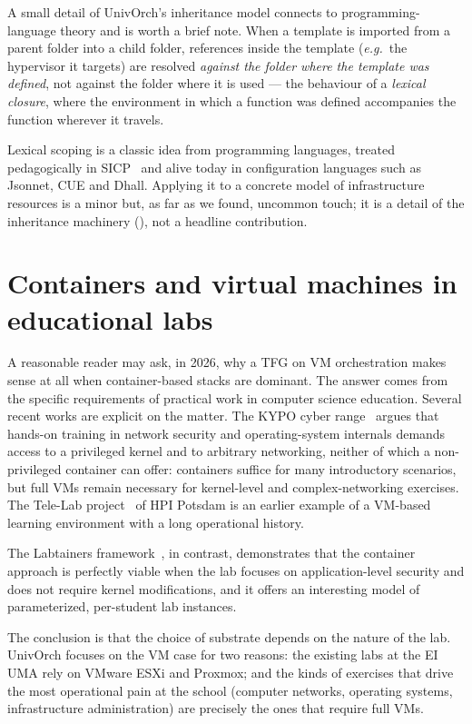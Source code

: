 A small detail of UnivOrch's inheritance model connects to
programming-language theory and is worth a brief note. When a template
is imported from a parent folder into a child folder, references inside
the template (\textit{e.g.}\ the hypervisor it targets) are resolved
\emph{against the folder where the template was defined}, not against
the folder where it is used --- the behaviour of a \emph{lexical
closure}, where the environment in which a function was defined
accompanies the function wherever it travels.

Lexical scoping is a classic idea from programming languages, treated
pedagogically in SICP~\cite{abelson1996sicp} and alive today in
configuration languages such as Jsonnet, CUE and Dhall. Applying it to
a concrete model of infrastructure resources is a minor but, as far as
we found, uncommon touch; it is a detail of the inheritance machinery
(), not a headline contribution.

\section{Containers and virtual machines in educational labs}
\label{sec:vm-vs-container}

A reasonable reader may ask, in 2026, why a TFG on VM orchestration
makes sense at all when container-based stacks are dominant. The
answer comes from the specific requirements of practical work in
computer science education. Several recent works are explicit on the
matter. The KYPO cyber range~\cite{vykopal2017kypo} argues that
hands-on training in network security and operating-system
internals demands access to a privileged kernel and to arbitrary
networking, neither of which a non-privileged container can offer:
containers suffice for many introductory scenarios, but full VMs
remain necessary for kernel-level and complex-networking exercises.
The Tele-Lab project~\cite{willems2012telelab} of HPI Potsdam is an
earlier example of a VM-based learning environment with a long
operational history.

The Labtainers framework~\cite{irvine2017labtainers}, in contrast,
demonstrates that the container approach is perfectly viable when
the lab focuses on application-level security and does not require
kernel modifications, and it offers an interesting model of
parameterized, per-student lab instances.

The conclusion is that the choice of substrate depends on the
nature of the lab. UnivOrch focuses on the VM case for two reasons:
the existing labs at the EI UMA rely on VMware ESXi and Proxmox; and
the kinds of exercises that drive the most operational pain at the
school (computer networks, operating systems, infrastructure
administration) are precisely the ones that require full VMs.

